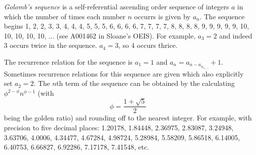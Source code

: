 \documentclass[12pt]{article}
\begin{document}
{\em Golomb's sequence} is a self-referential ascending order sequence of integers $a$ in which the number of times each number $n$ occurrs is given by $a_n$. The sequence begins 1, 2, 2, 3, 3, 4, 4, 4, 5, 5, 5, 6, 6, 6, 6, 7, 7, 7, 7, 8, 8, 8, 8, 9, 9, 9, 9, 9, 10, 10, 10, 10, 10, ... (see A001462 in Sloane's OEIS). For example, $a_3 = 2$ and indeed 3 occurs twice in the sequence. $a_4 = 3$, so 4 occurs thrice.

The recurrence relation for the sequence is $a_1 = 1$ and $a_n = a_{n - a_{a_{a_{n - 1}}}} + 1$. Sometimes recurrence relations for this sequence are given which also explicitly set $a_2 = 2$. The $n$th term of the sequence can be obtained by the calculating $\phi^{2 - \phi} n^{\phi - 1}$ (with $$\phi = \frac{1 + \sqrt{5}}{2}$$ being the golden ratio) and rounding off to the nearest integer. For example, with precision to five decimal places: 1.20178, 1.84448, 2.36975, 2.83087, 3.24948, 3.63706, 4.0006, 4.34477, 4.67284, 4.98724, 5.28984, 5.58209, 5.86518, 6.14005, 6.40753, 6.66827, 6.92286, 7.17178, 7.41548, etc.
\end{document}
